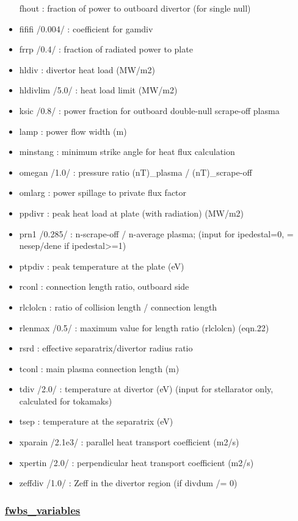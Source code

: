\documentclass[]{article}
\begin{document}
\begin{itemize}
  fhout : fraction of power to outboard divertor (for single null)
\item
  fififi /0.004/ : coefficient for gamdiv
\item
  frrp /0.4/ : fraction of radiated power to plate
\item
  hldiv : divertor heat load (MW/m2)
\item
  hldivlim /5.0/ : heat load limit (MW/m2)
\item
  ksic /0.8/ : power fraction for outboard double-null scrape-off plasma
\item
  lamp : power flow width (m)
\item
  minstang : minimum strike angle for heat flux calculation
\item
  omegan /1.0/ : pressure ratio (nT)\_plasma / (nT)\_scrape-off
\item
  omlarg : power spillage to private flux factor
\item
  ppdivr : peak heat load at plate (with radiation) (MW/m2)
\item
  prn1 /0.285/ : n-scrape-off / n-average plasma; (input for
  ipedestal=0, = nesep/dene if ipedestal\textgreater{}=1)
\item
  ptpdiv : peak temperature at the plate (eV)
\item
  rconl : connection length ratio, outboard side
\item
  rlclolcn : ratio of collision length / connection length
\item
  rlenmax /0.5/ : maximum value for length ratio (rlclolcn) (eqn.22)
\item
  rsrd : effective separatrix/divertor radius ratio
\item
  tconl : main plasma connection length (m)
\item
  tdiv /2.0/ : temperature at divertor (eV) (input for stellarator only,
  calculated for tokamaks)
\item
  tsep : temperature at the separatrix (eV)
\item
  xparain /2.1e3/ : parallel heat transport coefficient (m2/s)
\item
  xpertin /2.0/ : perpendicular heat transport coefficient (m2/s)
\item
  zeffdiv /1.0/ : Zeff in the divertor region (if divdum /= 0)
\end{itemize}

\hypertarget{fwbs_variables}{%
\subsubsection{\texorpdfstring{\href{fwbs_variables.html}{fwbs\_variables}}{fwbs\_variables}}\label{fwbs_variables}}
\end{document}

